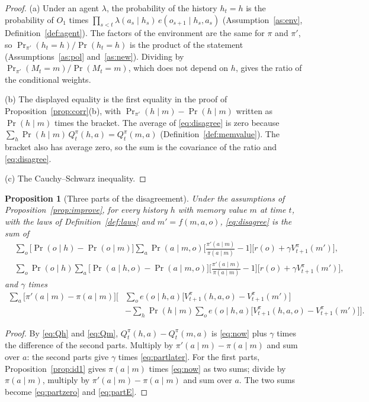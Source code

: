 \documentclass{article}
\newtheorem{proposition}{Proposition}[section]
\theoremstyle{definition}
\numberwithin{equation}{section}
\newcommand{\Prn}{\Pr\nolimits_{\pi'}}
\begin{document}
\begin{proof}
(a) Under an agent $\lambda$, the probability of the history $h_t=h$ is the probability of $O_1$ times $\prod_{s<t}\lambda(a_s\mid h_s)\,e(o_{s+1}\mid h_s,a_s)$ (Assumption~\ref{as:env}, Definition~\ref{def:agent}). The factors of the environment are the same for $\pi$ and $\pi'$, so $\Prn(h_t=h)/\Pr(h_t=h)$ is the product of the statement (Assumptions~\ref{as:pol} and~\ref{as:new}). Dividing by $\Prn(M_t=m)/\Pr(M_t=m)$, which does not depend on $h$, gives the ratio of the conditional weights.

(b) The displayed equality is the first equality in the proof of Proposition~\ref{prop:corr}(b), with $\Prn(h\mid m)-\Pr(h\mid m)$ written as $\Pr(h\mid m)$ times the bracket. The average of \eqref{eq:disagree} is zero because $\sum_h\Pr(h\mid m)\,Q^\pi_t(h,a)=Q^\pi_t(m,a)$ (Definition~\ref{def:memvalue}). The bracket also has average zero, so the sum is the covariance of the ratio and \eqref{eq:disagree}.

(c) The Cauchy--Schwarz inequality.
\end{proof}

\begin{proposition}[Three parts of the disagreement]\label{prop:threeparts}
Under the assumptions of Proposition~\ref{prop:improve}, for every history $h$ with memory value $m$ at time $t$, with the laws of Definition~\ref{def:laws} and $m'=f(m,a,o)$, \eqref{eq:disagree} is the sum of
\begin{align}
&\sum_o\big[\Pr(o\mid h)-\Pr(o\mid m)\big]\sum_a\Pr(a\mid m,o)\Big[\frac{\pi'(a\mid m)}{\pi(a\mid m)}-1\Big]\big[r(o)+\gamma V^\pi_{t+1}(m')\big], \label{eq:partzero}\\
&\sum_o\Pr(o\mid h)\sum_a\big[\Pr(a\mid h,o)-\Pr(a\mid m,o)\big]\Big[\frac{\pi'(a\mid m)}{\pi(a\mid m)}-1\Big]\big[r(o)+\gamma V^\pi_{t+1}(m')\big], \label{eq:partE}
\end{align}
and $\gamma$ times
\begin{equation}\label{eq:partlater}
\begin{aligned}
\sum_a\big[\pi'(a\mid m)-\pi(a\mid m)\big]\Big[&\sum_oe(o\mid h,a)\big[V^\pi_{t+1}(h,a,o)-V^\pi_{t+1}(m')\big]\\
&-\sum_h\Pr(h\mid m)\sum_oe(o\mid h,a)\big[V^\pi_{t+1}(h,a,o)-V^\pi_{t+1}(m')\big]\Big].
\end{aligned}
\end{equation}
\end{proposition}

\begin{proof}
By \eqref{eq:Qh} and \eqref{eq:Qm}, $Q^\pi_t(h,a)-Q^\pi_t(m,a)$ is \eqref{eq:now} plus $\gamma$ times the difference of the second parts. Multiply by $\pi'(a\mid m)-\pi(a\mid m)$ and sum over $a$: the second parts give $\gamma$ times \eqref{eq:partlater}. For the first parts, Proposition~\ref{prop:id1} gives $\pi(a\mid m)$ times \eqref{eq:now} as two sums; divide by $\pi(a\mid m)$, multiply by $\pi'(a\mid m)-\pi(a\mid m)$ and sum over $a$. The two sums become \eqref{eq:partzero} and \eqref{eq:partE}.
\end{proof}
\end{document}
